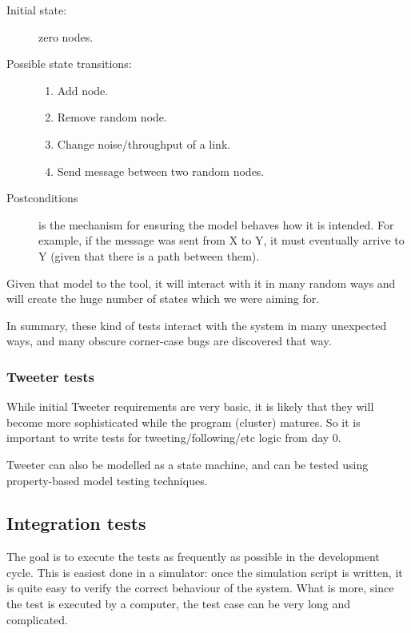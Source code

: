 \documentclass[english,11pt]{article}
\numberwithin{equation}{section}
\begin{document}
\begin{description}
    \item[Initial state:] zero nodes.
    \item[Possible state transitions:]
        \begin{enumerate}
            \item Add node.
            \item Remove random node.
            \item Change noise/throughput of a link.
            \item Send message between two random nodes.
        \end{enumerate}
    \item[Postconditions] is the mechanism for ensuring the model behaves how it
        is intended. For example, if the message was sent from X to Y, it must
        eventually arrive to Y (given that there is a path between them).
\end{description}

Given that model to the tool, it will interact with it in many random ways and
will create the huge number of states which we were aiming for.

In summary, these kind of tests interact with the system in many unexpected
ways, and many obscure corner-case bugs are discovered that way.

\subsubsection{Tweeter tests}

While initial Tweeter requirements are very basic, it is likely that they will
become more sophisticated while the program (cluster) matures. So it is
important to write tests for tweeting/following/etc logic from day 0.

Tweeter can also be modelled as a state machine, and can be tested using
property-based model testing techniques.

\subsection{Integration tests}

The goal is to execute the tests as frequently as possible in the development
cycle. This is easiest done in a simulator: once the simulation script is
written, it is quite easy to verify the correct behaviour of the system. What is
more, since the test is executed by a computer, the test case can be very long
and complicated.
\end{document}
